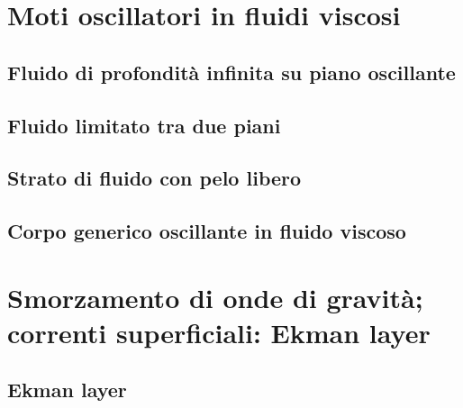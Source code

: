 \documentclass[a4paper,11pt]{report}
\begin{document}
\chapter{Moti oscillatori in fluidi viscosi}

	\section{Fluido di profondità infinita su piano oscillante}
	\section{Fluido limitato tra due piani}
	\section{Strato di fluido con pelo libero}
	\section{Corpo generico oscillante in fluido viscoso}

\chapter{Smorzamento di onde di gravità; correnti superficiali: Ekman layer}

	\section{Ekman layer}
	
	
\end{document}
